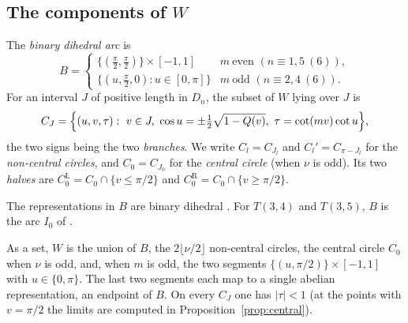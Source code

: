 \subsection{The components of \texorpdfstring{$W$}{W}}\label{sec:classification}

\begin{definition}\label{def:components}
The \emph{binary dihedral arc} is
\[
B=\begin{cases}\{(\tfrac\pi2,\tfrac\pi2)\}\times[-1,1]&m\ \text{even }(n\equiv1,5\ (6)),\\
\{(u,\tfrac\pi2,0):u\in[0,\pi]\}&m\ \text{odd }(n\equiv2,4\ (6)).\end{cases}
\]
For an interval $J$ of positive length in $D_n$, the subset of $W$ lying over $J$ is
\[
C_J=\Bigl\{(u,v,\tau):\ v\in J,\ \cos u=\pm\tfrac12\sqrt{1-Q(v)},\ \tau=\cot(mv)\cot u\Bigr\},
\]
the two signs being the two \emph{branches}. We write $C_l=C_{J_l}$ and $C_l'=C_{\pi-J_l}$ for the
\emph{non-central circles}, and $C_0=C_{J_0}$ for the \emph{central circle} (when $\nu$ is odd). Its two
\emph{halves} are $C_0^{\mathrm L}=C_0\cap\{v\le\pi/2\}$ and $C_0^{\mathrm R}=C_0\cap\{v\ge\pi/2\}$.
\end{definition}

The representations in $B$ are binary dihedral \cite[\S\S3--4]{FKP}. For $T(3,4)$ and $T(3,5)$, $B$ is the arc $I_0$ of
\cite[\S\S11.6--11.7]{HHK2}.

\begin{proposition}\label{prop:classify}
As a set, $W$ is the union of $B$, the $2\lfloor\nu/2\rfloor$ non-central circles, the central circle $C_0$ when
$\nu$ is odd, and, when $m$ is odd, the two segments $\{(u,\pi/2)\}\times[-1,1]$ with $u\in\{0,\pi\}$. The last two
segments each map to a single abelian representation, an endpoint of $B$. On every $C_J$ one has $|\tau|<1$
(at the points with $v=\pi/2$ the limits are computed in Proposition~\ref{prop:central}).
\end{proposition}

